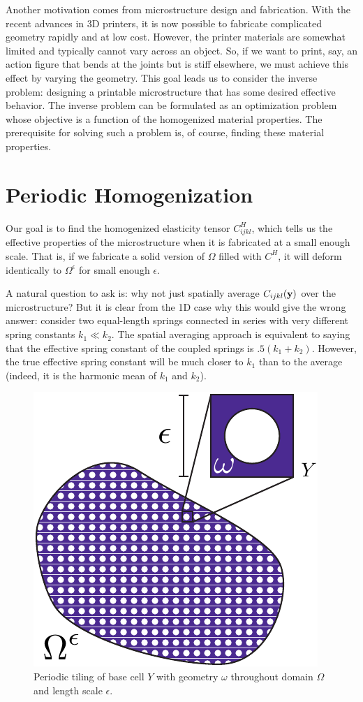 \documentclass[10pt]{article}
\providecommand{\e}{\epsilon}
\begin{document}
Another motivation comes from microstructure design and fabrication. With the
recent advances in 3D printers, it is now possible to fabricate complicated
geometry rapidly and at low cost. However, the printer materials are somewhat
limited and typically cannot vary across an object. So, if we want to print,
say, an action figure that bends at the joints but is stiff elsewhere, we must
achieve this effect by varying the geometry. This goal leads us to consider the
inverse problem: designing a printable microstructure that has some desired
effective behavior. The inverse problem can be formulated as an optimization
problem whose objective is a function of the homogenized material properties.
The prerequisite for solving such a problem is, of course, finding these
material properties.

\section{Periodic Homogenization}
Our goal is to find the homogenized elasticity tensor $C^H_{ijkl}$,
which tells us the effective properties of the microstructure when it is
fabricated at a small enough scale. That is, if we fabricate a solid version of
$\Omega$ filled with $C^H$, it will deform identically to $\Omega^\e$ for small
enough $\e$.

A natural question to ask is: why not just spatially
average $C_{ijkl}({\bf y})$ over the microstructure? But it is clear from the
1D case why this would give the wrong answer: consider two equal-length springs
connected in series with very different spring constants $k_1 \ll k_2$. The
spatial averaging approach is equivalent to saying that the effective spring
constant of the coupled springs is $.5 (k_1 + k_2)$. However, the true
effective spring constant will be much closer to $k_1$ than to the average
(indeed, it is the harmonic mean of $k_1$ and $k_2$).

\begin{figure}
    \centering
    \includegraphics[width=.35\textwidth]{Images/periodic.pdf}
    \caption{Periodic tiling of base cell $Y$ with geometry $\omega$ throughout
    domain $\Omega$ and length scale $\e$.}
    \label{fig:periodic}
\end{figure}
\end{document}
